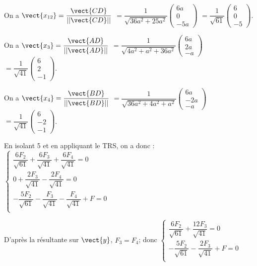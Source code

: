 \ifprof
\begin{corrige}
On a $\vect{x_{12}} = \dfrac{\vect{CD}}{||\vect{CD}||}$
$ =\dfrac{1}{\sqrt{36a^2+25a^2}} \begin{pmatrix}6a \\ 0 \\ -5a \end{pmatrix}$ 
$= \dfrac{1}{\sqrt{61}} \begin{pmatrix}6 \\ 0 \\ -5 \end{pmatrix}$.


On a $\vect{x_{3}} = \dfrac{\vect{AD}}{||\vect{AD}||}$
$ =\dfrac{1}{\sqrt{4a^2+a^2 +36a^2}} \begin{pmatrix}6a \\ 2a \\ -a \end{pmatrix}$ 
$= \dfrac{1}{\sqrt{41}} \begin{pmatrix}6 \\ 2 \\ -1 \end{pmatrix}$.

On a $\vect{x_{4}} = \dfrac{\vect{BD}}{||\vect{BD}||}$
$ =\dfrac{1}{\sqrt{36a^2+4a^2 +a^2}} \begin{pmatrix}6a \\ -2a \\ -a \end{pmatrix}$ 
$= \dfrac{1}{\sqrt{41}} \begin{pmatrix}6 \\ -2 \\ -1 \end{pmatrix}$.

En isolant 5 et en appliquant le TRS, on a donc :
$
\left\{
\begin{array}{l}
\dfrac{6F_2}{\sqrt{61}}	+\dfrac{6F_3}{\sqrt{41}}	+\dfrac{6F_4}{\sqrt{41}}=0 \\
0		+\dfrac{2F_3}{\sqrt{41}}	-\dfrac{2F_4}{\sqrt{41}}=0 \\
-\dfrac{5F_2}{\sqrt{61}}	-\dfrac{F_3}{\sqrt{41}}		-\dfrac{F_4}{\sqrt{41}} + F=0 \\
\end{array}
\right.
$

D'après la résultante sur $\vect{y}$, $F_3=F_4$; donc 
$
\left\{
\begin{array}{l}
\dfrac{6F_2}{\sqrt{61}}	+\dfrac{12F_3}{\sqrt{41}} =0 \\
-\dfrac{5F_2}{\sqrt{61}}	-\dfrac{2F_3}{\sqrt{41}} + F=0 \\
\end{array}
\right.
$


\end{corrige}
